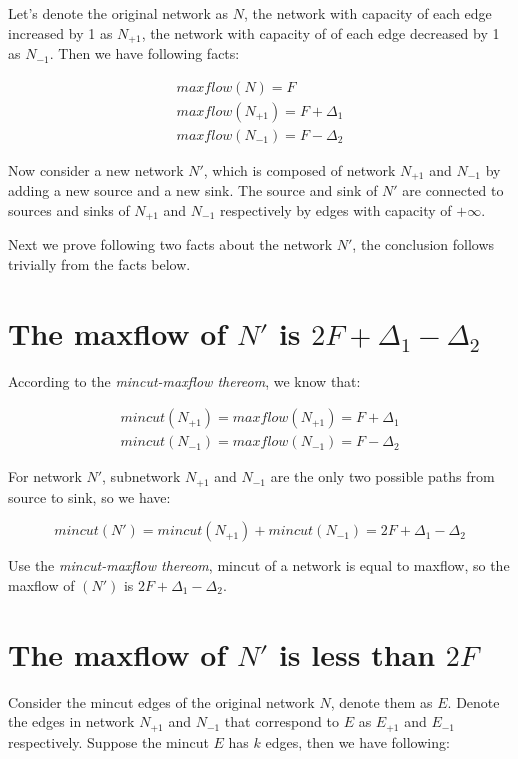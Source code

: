 
Let's denote the original network as $N$, the network with capacity of each edge increased by 1 as $N_{+1}$, the network with capacity of of each edge decreased by 1 as $N_{-1}$. Then we have following facts:

\[
  \begin{array}{l}
    maxflow(N) = F \\
    maxflow(N_{+1}) = F + \Delta_1 \\
    maxflow(N_{-1}) = F - \Delta_2
  \end{array}
\]

Now consider a new network $N\prime$, which is composed of network $N_{+1}$ and $N_{-1}$ by adding a new source and a new sink. The source and sink of $N\prime$ are connected to sources and sinks of $N_{+1}$ and $N_{-1}$ respectively by edges with capacity of $+\infty$.

Next we prove following two facts about the network $N\prime$, the conclusion follows trivially from the facts below.

\section{The maxflow of $N\prime$ is $2F + \Delta_1 - \Delta_2$}

According to the \textit{mincut-maxflow thereom}, we know that:

\[
  \begin{array}{c}
    mincut(N_{+1}) = maxflow(N_{+1}) = F + \Delta_1 \\
    mincut(N_{-1}) = maxflow(N_{-1}) = F - \Delta_2
  \end{array}
\]

For network $N\prime$, subnetwork $N_{+1}$ and $N_{-1}$ are the only two possible paths from source to sink, so we have:

\[
  mincut(N\prime) = mincut(N_{+1}) + mincut(N_{-1}) = 2F + \Delta_1 - \Delta_2
\]

Use the \textit{mincut-maxflow thereom}, mincut of a network is equal to maxflow, so the maxflow of $(N\prime)$ is $2F + \Delta_1 - \Delta_2$.

\section{The maxflow of $N\prime$ is less than $2F$}

Consider the mincut edges of the original network $N$, denote them as $E$. Denote the edges in network $N_{+1}$ and $N_{-1}$ that correspond to $E$ as $E_{+1}$ and $E_{-1}$ respectively. Suppose the mincut $E$ has $k$ edges, then we have following:

